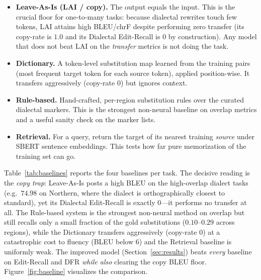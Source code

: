 \documentclass[11pt]{article}
\begin{document}
\begin{itemize}[leftmargin=1.4em,itemsep=2pt,topsep=2pt]
  \item \textbf{Leave-As-Is (LAI / copy).} The output equals the input. This is the
    crucial floor for one-to-many tasks: because dialectal rewrites touch few
    tokens, LAI attains high BLEU/chrF despite performing zero transfer (its
    copy-rate is $1.0$ and its Dialectal Edit-Recall is $0$ by construction). Any
    model that does not beat LAI on the \emph{transfer} metrics is not doing the
    task.
  \item \textbf{Dictionary.} A token-level substitution map learned from the
    training pairs (most frequent target token for each source token), applied
    position-wise. It transfers aggressively (copy-rate $0$) but ignores context.
  \item \textbf{Rule-based.} Hand-crafted, per-region substitution rules over the
    curated dialectal markers. This is the strongest non-neural baseline on overlap
    metrics and a useful sanity check on the marker lists.
  \item \textbf{Retrieval.} For a query, return the target of its nearest training
    \emph{source} under SBERT sentence embeddings. This tests how far pure
    memorization of the training set can go.
\end{itemize}

Table~\ref{tab:baselines} reports the four baselines per task. The decisive
reading is the \emph{copy trap}: Leave-As-Is posts a high BLEU on the
high-overlap dialect tasks (e.g.\ $74.98$ on Northern, where the dialect is
orthographically closest to standard), yet its Dialectal Edit-Recall is exactly
$0$---it performs no transfer at all. The Rule-based system is the strongest
non-neural method on overlap but still recalls only a small fraction of the gold
substitutions ($0.10$--$0.29$ across regions), while the Dictionary transfers
aggressively (copy-rate $0$) at a catastrophic cost to fluency (BLEU below $6$)
and the Retrieval baseline is uniformly weak. The improved model
(Section~\ref{sec:results}) beats \emph{every} baseline on Edit-Recall and DFR
\emph{while also} clearing the copy BLEU floor.
Figure~\ref{fig:baseline} visualizes the comparison.
\end{document}
